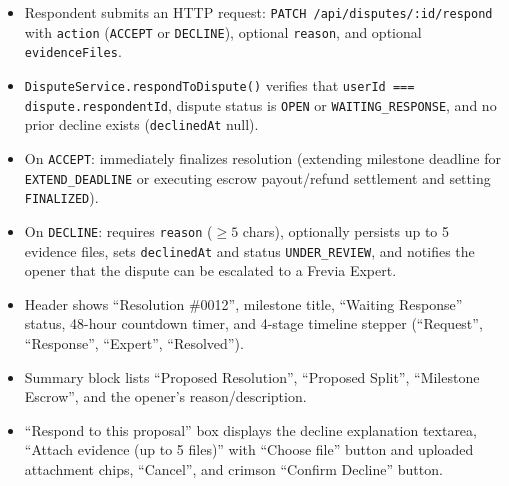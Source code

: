 \begin{itemize}[leftmargin=1.6em,topsep=3pt,itemsep=2pt,parsep=0pt,label=$\bullet$]
      \item Respondent submits an HTTP request: \texttt{PATCH /\allowbreak{}api/\allowbreak{}disputes/\allowbreak{}:\allowbreak{}id/\allowbreak{}respond} with \texttt{action} (\texttt{ACCEPT} or \texttt{DECLINE}), optional \texttt{reason}, and optional \texttt{evidenceFiles}.
      \item {\sloppy \texttt{DisputeService.\allowbreak{}respondToDispute()} verifies that \texttt{userId === dispute.respondentId}, dispute status is \texttt{OPEN} or \texttt{WAITING\_RESPONSE}, and no prior decline exists (\texttt{declinedAt} null).\par}
      \item On \texttt{ACCEPT}: immediately finalizes resolution (extending milestone deadline for \texttt{EXTEND\_DEADLINE} or executing escrow payout/refund settlement and setting \texttt{FINALIZED}).
      \item On \texttt{DECLINE}: requires \texttt{reason} ($\ge 5$ chars), optionally persists up to 5 evidence files, sets \texttt{declinedAt} and status \texttt{UNDER\_REVIEW}, and notifies the opener that the dispute can be escalated to a Frevia Expert.
\end{itemize}

\begin{itemize}[leftmargin=1.6em,topsep=3pt,itemsep=2pt,parsep=0pt,label=$\bullet$]
      \item Header shows ``Resolution \#0012'', milestone title, ``Waiting Response'' status, 48-hour countdown timer, and 4-stage timeline stepper (``Request'', ``Response'', ``Expert'', ``Resolved'').
      \item Summary block lists ``Proposed Resolution'', ``Proposed Split'', ``Milestone Escrow'', and the opener's reason/description.
      \item ``Respond to this proposal'' box displays the decline explanation textarea, ``Attach evidence (up to 5 files)'' with ``Choose file'' button and uploaded attachment chips, ``Cancel'', and crimson ``Confirm Decline'' button.
\end{itemize}


